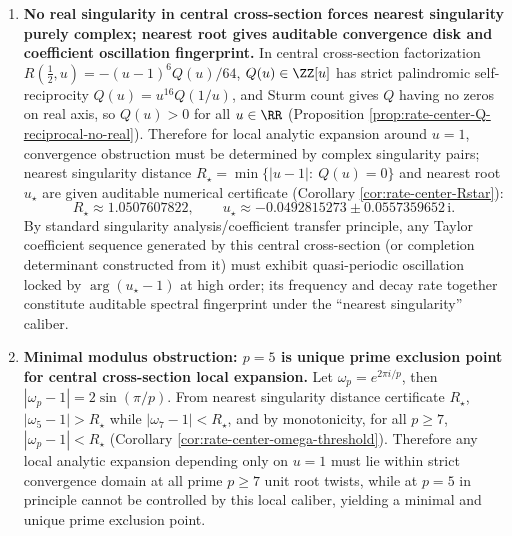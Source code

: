 \begin{enumerate}
  \item \textbf{No real singularity in central cross-section forces nearest singularity purely complex; nearest root gives auditable convergence disk and coefficient oscillation fingerprint.}
  In central cross-section factorization \(R(\tfrac12,u)=-(u-1)^6Q(u)/64\), \(Q(u)\in\ZZ[u]\) has strict palindromic self-reciprocity \(Q(u)=u^{16}Q(1/u)\), and Sturm count gives \(Q\) having no zeros on real axis, so \(Q(u)>0\) for all \(u\in\RR\) (Proposition \ref{prop:rate-center-Q-reciprocal-no-real}).
  Therefore for local analytic expansion around \(u=1\), convergence obstruction must be determined by complex singularity pairs; nearest singularity distance
  \(
  R_\star=\min\{|u-1|:\ Q(u)=0\}
  \)
  and nearest root \(u_\star\) are given auditable numerical certificate (Corollary \ref{cor:rate-center-Rstar}):
  \[
  R_\star\approx 1.0507607822,
  \qquad
  u_\star\approx -0.0492815273\pm 0.0557359652\,\mathrm{i}.
  \]
  By standard singularity analysis/coefficient transfer principle, any Taylor coefficient sequence generated by this central cross-section (or completion determinant constructed from it) must exhibit quasi-periodic oscillation locked by \(\arg(u_\star-1)\) at high order; its frequency and decay rate together constitute auditable spectral fingerprint under the ``nearest singularity'' caliber.

  \item \textbf{Minimal modulus obstruction: \texorpdfstring{$p=5$}{p=5} is unique prime exclusion point for central cross-section local expansion.}
  Let \(\omega_p=e^{2\pi i/p}\), then \(|\omega_p-1|=2\sin(\pi/p)\).
  From nearest singularity distance certificate \(R_\star\),
  \(
  |\omega_5-1|>R_\star
  \)
  while
  \(
  |\omega_7-1|<R_\star
  \), and by monotonicity, for all \(p\ge 7\), \(|\omega_p-1|<R_\star\) (Corollary \ref{cor:rate-center-omega-threshold}).
  Therefore any local analytic expansion depending only on \(u=1\) must lie within strict convergence domain at all prime \(p\ge 7\) unit root twists, while at \(p=5\) in principle cannot be controlled by this local caliber, yielding a minimal and unique prime exclusion point.


\end{enumerate}
